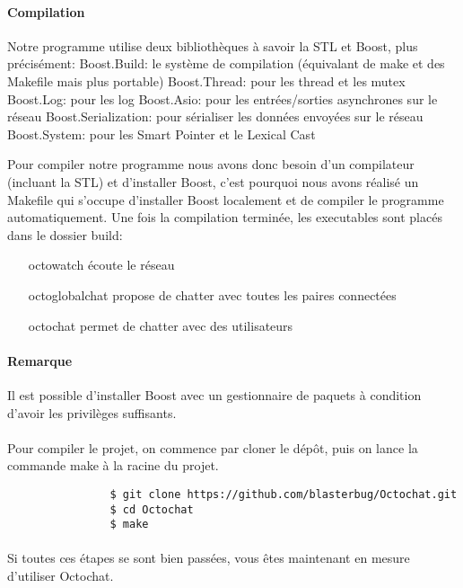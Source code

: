 \documentclass[a4paper]{article}
\begin{document}
			\paragraph{Compilation}{
			Notre programme utilise deux bibliothèques à savoir la STL et Boost, plus précisément:
			Boost.Build: le système de compilation (équivalant de make et des Makefile mais plus portable)
			Boost.Thread: pour les thread et les mutex
			Boost.Log: pour les log
			Boost.Asio: pour les entrées/sorties asynchrones sur le réseau
			Boost.Serialization: pour sérialiser les données envoyées sur le réseau
			Boost.System: pour les Smart Pointer et le Lexical Cast

			Pour compiler notre programme nous avons donc besoin d’un compilateur (incluant la STL) et d’installer Boost, c’est pourquoi nous avons réalisé un Makefile qui s’occupe d’installer Boost localement et de compiler le programme automatiquement.
			Une fois la compilation terminée, les executables sont placés dans le dossier build:
			\begin{itemize}
				\item[octowatch] écoute le réseau
				\item[octoglobalchat] propose de chatter avec toutes les paires connectées
				\item[octochat] permet de chatter avec des utilisateurs
			\end{itemize}

			}
			\paragraph{Remarque}{
				Il est possible d’installer Boost avec un gestionnaire de paquets à condition d’avoir les privilèges suffisants.
			}


			\paragraph{}{
				Pour compiler le projet, on commence par cloner le dépôt, puis on lance la commande make à la racine du projet.
			}
			
			\begin{verbatim}
				$ git clone https://github.com/blasterbug/Octochat.git
				$ cd Octochat
				$ make
			\end{verbatim}

			\paragraph{}{
			Si toutes ces étapes se sont bien passées, vous êtes maintenant en mesure d'utiliser Octochat.
			}
		
\end{document}
